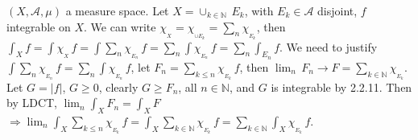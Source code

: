 \documentclass[12pt]{article}
\newcommand{\nats}[0] { \mathbb{N}}
\newcommand{\rimply}[0] { \Rightarrow }
\begin{document}
\begin{flushleft}

$(X,\mathcal A, \mu )$ a measure space. Let $X = \cup_{k \in \nats} \, E_k$, with $E_k \in \mathcal A$ disjoint, $f$ integrable on $X$.
We can write $\chi_{_X} = \chi_{_{\cup E_k}} = \sum_n \chi_{_{E_k}}$, then $\int_X f = \int \chi_{_X} \, f = \int  \sum_n \chi_{_{E_n}} \, f = \sum_n \int \chi_{_{E_n}} \, f = \sum_n \int_{E_n}  f$. We need to justify $ \int  \sum_n \chi_{_{E_n}} \, f = \sum_n \int \chi_{_{E_n}} \, f$, let $F_n = \sum_{k \le n} \chi_{_{E_k}} \, f$, then $ \lim_{n} \, F_n \rightarrow F = \sum_{k \in \nats} \chi_{_{E_k}}$. Let $G = |f|$, $G \ge 0$, clearly $G \ge F_n$, all $n \in \nats$, and $G$ is integrable by 2.2.11. Then by LDCT, $\lim_n \int_X F_n = \int_X F$ $\rimply \lim_n \int_X \sum_{k \le n} \chi_{_{E_k}} \, f = \int_X \sum_{k \in \nats} \chi_{_{E_k}} \, f = \sum_{k \in \nats} \int_X  \chi_{_{E_k}} \, f$.



\end{flushleft}
\end{document}
